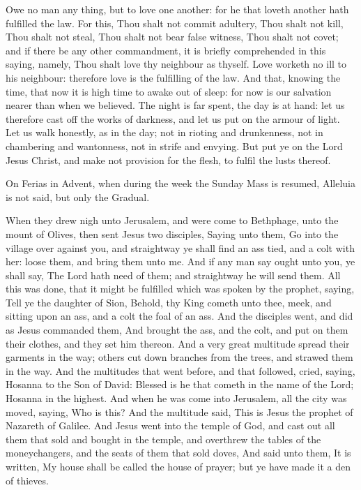 
\vspace{-0.13\baselineskip}

 Owe no man any thing, but to love one another: for he that loveth another hath fulfilled the law. For this, Thou shalt not commit adultery, Thou shalt not kill, Thou shalt not steal, Thou shalt not bear false witness, Thou shalt not covet; and if there be any other commandment, it is briefly comprehended in this saying, namely, Thou shalt love thy neighbour as thyself. Love worketh no ill to his neighbour: therefore love is the fulfilling of the law. And that, knowing the time, that now it is high time to awake out of sleep: for now is our salvation nearer than when we believed. The night is far spent, the day is at hand: let us therefore cast off the works of darkness, and let us put on the armour of light. Let us walk honestly, as in the day; not in rioting and drunkenness, not in chambering and wantonness, not in strife and envying. But put ye on the Lord Jesus Christ, and make not provision for the flesh, to fulfil the lusts thereof.
\begin{rubric}
    On Ferias in Advent, when during the week the Sunday Mass is resumed, Alleluia is not said, but only the Gradual.
\end{rubric}

 When they drew nigh unto Jerusalem, and were come to Bethphage, unto the mount of Olives, then sent Jesus two disciples, Saying unto them, Go into the village over against you, and straightway ye shall find an ass tied, and a colt with her: loose them, and bring them unto me. And if any man say ought unto you, ye shall say, The Lord hath need of them; and straightway he will send them. All this was done, that it might be fulfilled which was spoken by the prophet, saying, Tell ye the daughter of Sion, Behold, thy King cometh unto thee, meek, and sitting upon an ass, and a colt the foal of an ass. And the disciples went, and did as Jesus commanded them, And brought the ass, and the colt, and put on them their clothes, and they set him thereon. And a very great multitude spread their garments in the way; others cut down branches from the trees, and strawed them in the way. And the multitudes that went before, and that followed, cried, saying, Hosanna to the Son of David: Blessed is he that cometh in the name of the Lord; Hosanna in the highest. And when he was come into Jerusalem, all the city was moved, saying, Who is this? And the multitude said, This is Jesus the prophet of Nazareth of Galilee. And Jesus went into the temple of God, and cast out all them that sold and bought in the temple, and overthrew the tables of the moneychangers, and the seats of them that sold doves, And said unto them, It is written, My house shall be called the house of prayer; but ye have made it a den of thieves.

